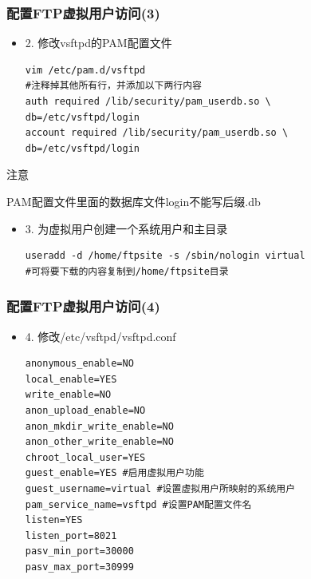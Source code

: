 \documentclass[xcolor=svgnames,presentation]{beamer}
\begin{document}
\begin{frame}[fragile]
\frametitle{配置FTP虚拟用户访问(3)}
\label{sec-3-16}
\begin{itemize}

\item 2. 修改vsftpd的PAM配置文件\\
\label{sec-3-16-1}%
\begin{verbatim}
vim /etc/pam.d/vsftpd
#注释掉其他所有行，并添加以下两行内容
auth required /lib/security/pam_userdb.so \
db=/etc/vsftpd/login
account required /lib/security/pam_userdb.so \
db=/etc/vsftpd/login
\end{verbatim}
\end{itemize} %
\begin{block}{注意}
\label{sec-3-16-2}

PAM配置文件里面的数据库文件login不能写后缀.db
\end{block}
\begin{itemize}

\item 3. 为虚拟用户创建一个系统用户和主目录\\
\label{sec-3-16-3}%
\begin{verbatim}
useradd -d /home/ftpsite -s /sbin/nologin virtual
#可将要下载的内容复制到/home/ftpsite目录
\end{verbatim}
\end{itemize} %
\end{frame}
\begin{frame}[fragile]
\frametitle{配置FTP虚拟用户访问(4)}
\label{sec-3-17}
\begin{itemize}

\item 4. 修改/etc/vsftpd/vsftpd.conf\\
\label{sec-3-17-1}%
\begin{verbatim}
anonymous_enable=NO
local_enable=YES
write_enable=NO
anon_upload_enable=NO
anon_mkdir_write_enable=NO
anon_other_write_enable=NO
chroot_local_user=YES
guest_enable=YES #启用虚拟用户功能
guest_username=virtual #设置虚拟用户所映射的系统用户
pam_service_name=vsftpd #设置PAM配置文件名
listen=YES
listen_port=8021
pasv_min_port=30000
pasv_max_port=30999
\end{verbatim}
\end{itemize} %
\end{frame}
\end{document}
